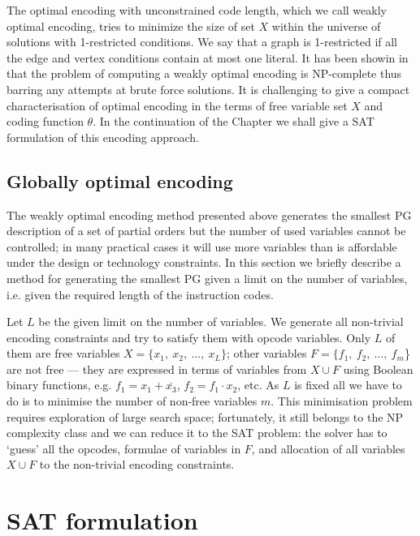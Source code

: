 The optimal encoding with unconstrained code length, which we call weakly optimal encoding, tries to minimize the size of set $X$ within the universe of solutions with 1-restricted conditions. We say that a graph is 1-restricted if all the edge and vertex conditions contain at most one literal. It has been showin in \cite{2009_mokhov_phd} that the problem of computing a weakly optimal encoding is NP-complete thus barring any attempts at brute force solutions. It is challenging to give a compact characterisation of optimal encoding in the terms of free variable set $X$ and coding function $\theta$. In the continuation of the Chapter we shall give a SAT formulation of this encoding approach. 


\subsection{Globally optimal encoding\label{Sec:Generating-optimal-opcodes}}

The weakly optimal encoding method presented above generates the smallest
PG description of a set of partial orders but the number of used
variables cannot be controlled; in many practical cases it will use
more variables than is affordable under the design or technology constraints.
In this section we briefly describe a method for generating the smallest
PG given a limit on the number of variables, i.e. given the required
length of the instruction codes.

Let $L$ be the given limit on the number of variables. We generate all non-trivial
encoding constraints and try to satisfy them with opcode variables.
Only $L$ of them are free variables $X=\{x_{1},\ x_{2},\ ...,\ x_{L}\}$;
other variables $F=\{f_{1},\ f_{2},\ ...,\ f_{m}$\} are not free
--- they are expressed in terms of variables from $X\cup F$ using
Boolean binary functions, e.g. $f_{1}=x_{1}+\overline{x_{3}}$, $f_{2}=f_{1}\cdot x_{2}$,
etc. As $L$ is fixed all we have to do is to minimise the number
of non-free variables $m$. This minimisation problem requires exploration
of large search space; fortunately, it still belongs to the NP complexity
class and we can reduce it to the SAT problem: the solver has to `guess'
all the opcodes, formulae of variables in $F$, and allocation of
all variables $X\cup F$ to the non-trivial encoding constraints.


\section{SAT formulation\label{sec:SAT-formulation}}

